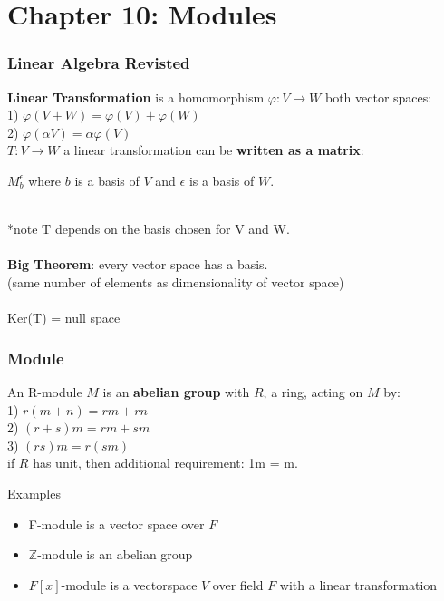 \documentclass[12pt]{article}
\def\Z{\ensuremath{\mathbb{Z}}}
\newcommand{\bt}[1]{\textbf{#1}} %
\begin{document}
\part*{Chapter 10: Modules}

\section*{Linear Algebra Revisted}

 \bt{Linear Transformation} is a homomorphism $\varphi: V \rightarrow W$ both vector spaces:\\
 1) $\varphi(V + W) = \varphi(V) + \varphi(W)$\\
 2) $\varphi(\alpha V) = \alpha \varphi(V)$\\

$T: V \rightarrow W$ a linear transformation can be \bt{written as a matrix}: \\
\centerline{$M_{b}^\epsilon$ where $b$ is a basis of $V$ and $\epsilon$ is a basis of $W$. }\\

*note T depends on the basis chosen for V and W. \\
 \ \\


\bt{Big Theorem}: every vector space has a basis.\\
(same number of elements as dimensionality of vector space)\\
\ \\

Ker(T) = null space

\section*{Module}

An R-module $M$ is an \bt{abelian group} with $R$, a ring, acting on $M$ by: \\
1) $r(m+n) = rm + rn$\\
2) $(r+s) m = rm + sm$\\
3) $(rs)m = r(sm)$\\

\noindent *if $R$ has unit, then additional requirement: 1m = m.

Examples
\begin{itemize}
    \item F-module is a vector space over $F$ 
    \item $\Z$-module is an abelian group
    \item $F[x]$-module is a vectorspace $V$ over field $F$ with a linear transformation
\end{itemize}
\end{document}
